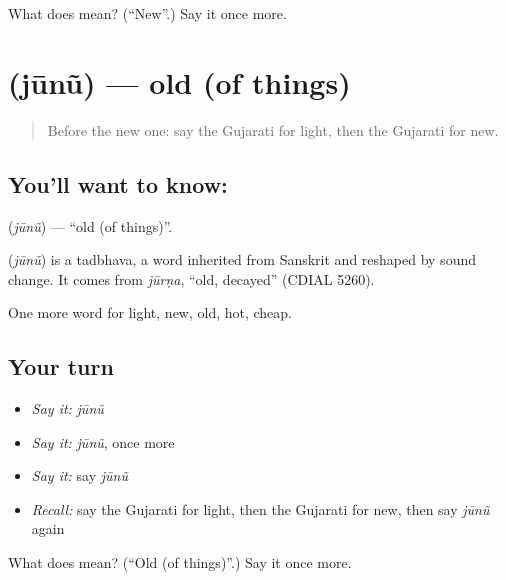 \begin{tcolorbox}[breakable,colback=teal!4,colframe=teal!35!black,title={Before you move on}]
What does  mean? (\textquotedblleft{}New\textquotedblright{}.) Say it once more.
\end{tcolorbox}
\section[\texorpdfstring{\gu{જૂનું} (jūnũ)}{જૂનું (jūnũ)}]{ (jūnũ) — old (of things)}

\label{lesson:GU-C73-old}



\begin{quote}
Before the new one: say the Gujarati for light, then the Gujarati for new.
\end{quote}

\subsection*{You'll want to know: }
\textbf{} (\emph{jūnũ}) — \textquotedblleft{}old (of things)\textquotedblright{}.

\begin{cousinweb}
\textbf{} (\emph{jūnũ}) is a tadbhava, a word inherited from Sanskrit and reshaped by sound change. It comes from \emph{jūrṇa}, \textquotedblleft{}old, decayed\textquotedblright{} (CDIAL 5260).
\end{cousinweb}

\begin{grammarlens}[title={What you've built}]
One more word for light, new, old, hot, cheap.
\end{grammarlens}

\subsection*{Your turn}
\begin{itemize}
\raggedright
  \item \emph{Say it:} \emph{jūnũ}
  \item \emph{Say it:} \emph{jūnũ}, once more
  \item \emph{Say it:} say \emph{jūnũ}
  \item \emph{Recall:} say the Gujarati for light, then the Gujarati for new, then say \emph{jūnũ} again
\end{itemize}

\begin{tcolorbox}[breakable,colback=teal!4,colframe=teal!35!black,title={Before you move on}]
What does  mean? (\textquotedblleft{}Old (of things)\textquotedblright{}.) Say it once more.
\end{tcolorbox}
